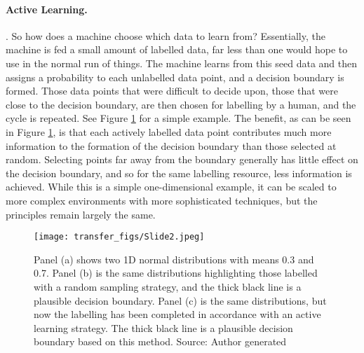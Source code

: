 \paragraph{Active Learning.}   \parencite{settles2009active}. So how does a machine choose which data to learn from? Essentially, the machine is fed a small amount of labelled data, far less than one would hope to use in the normal run of things. The machine learns from this seed data and then assigns a probability to each unlabelled data point, and a decision boundary is formed. Those data points that were difficult to decide upon, those that were close to the decision boundary, are then chosen for labelling by a human, and the cycle is repeated. See Figure \ref{fig:active} for a simple example. The benefit, as can be seen in Figure \ref{fig:active}, is that each actively labelled data point contributes much more information to the formation of the decision boundary than those selected at random. Selecting points far away from the boundary generally has little effect on the decision boundary, and so for the same labelling resource, less information is achieved. While this is a simple one-dimensional example, it can be scaled to more complex environments with more sophisticated techniques, but the principles remain largely the same.


\begin{figure}
  \texttt{[image: transfer\_figs/Slide2.jpeg]}
  \caption[Pictorial example of active learning strategy.]{ Panel (a) shows two 1D normal distributions with means 0.3 and 0.7. Panel (b) is the same distributions highlighting those labelled with a random sampling strategy, and the thick black line is a plausible decision boundary. Panel (c) is the same distributions, but now the labelling has been completed in accordance with an active learning strategy. The thick black line is a plausible decision boundary based on this method. Source: Author generated}
  \label{fig:active}
\end{figure}

